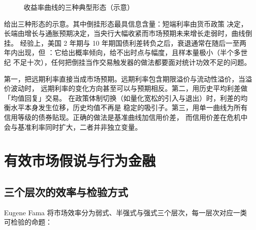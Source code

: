\begin{figure}[htbp]
\centering
{}
\caption{收益率曲线的三种典型形态（示意）}\label{fig:01-yieldcurve}
\end{figure}

 给出三种形态的示意。其中倒挂形态最具信息含量：短端利率由货币政策
决定，长端由增长与通胀预期决定，当央行大幅收紧而市场预期未来增长走弱时，曲线倒挂。
经验上，美国 2 年期与 10 年期国债利差转负之后，衰退通常在随后一至两年内出现，但
：它给出概率倾向，给不出时点与幅度，且样本量极小（半个多世纪
不足十次），任何把倒挂当作交易触发器的做法都要面对统计功效不足的问题。

\begin{warningbox}[期限结构的常见误用]
第一，把远期利率直接当成市场预期。远期利率包含期限溢价与流动性溢价，当溢价波动时，
远期利率的变化方向甚至可以与预期相反。第二，用历史平均利差做「均值回复」交易。
在政策体制切换（如量化宽松的引入与退出）时，利差的均衡水平本身发生位移，历史均值不再是
稳定的吸引子。第三，用单一曲线为所有信用等级的债券贴现。正确的做法是基准曲线加信用价差，
而信用价差在危机中会与基准利率同时扩大，二者并非独立变量。
\end{warningbox}

\section{有效市场假说与行为金融}

\subsection{三个层次的效率与检验方式}

Eugene Fama 将市场效率分为弱式、半强式与强式三个层次，每一层次对应一类可检验的命题：

